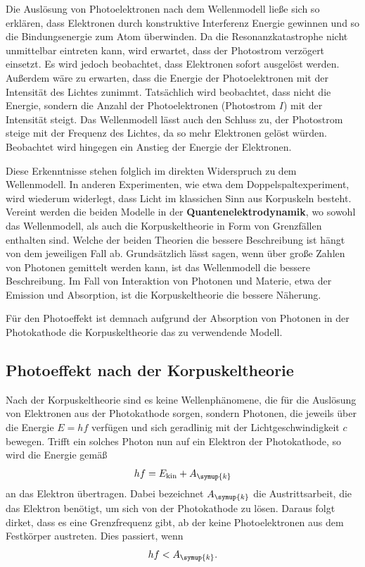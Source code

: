 Die Auslösung von Photoelektronen nach dem Wellenmodell ließe sich so erklären, dass Elektronen durch konstruktive Interferenz Energie
gewinnen und so die Bindungsenergie zum Atom überwinden.
Da die Resonanzkatastrophe nicht unmittelbar eintreten kann, wird erwartet, dass der Photostrom verzögert einsetzt. Es wird jedoch 
beobachtet, dass Elektronen sofort ausgelöst werden.
Außerdem wäre zu erwarten, dass die Energie der Photoelektronen mit der Intensität des Lichtes zunimmt. Tatsächlich wird beobachtet, dass
nicht die Energie, sondern die Anzahl der Photoelektronen (Photostrom $I$) mit der Intensität steigt.
Das Wellenmodell lässt auch den Schluss zu, der Photostrom steige mit der Frequenz des Lichtes, da so mehr Elektronen gelöst würden. 
Beobachtet wird hingegen ein Anstieg der Energie der Elektronen.

Diese Erkenntnisse stehen folglich im direkten Widerspruch zu dem Wellenmodell. In anderen Experimenten, wie etwa dem Doppelspaltexperiment,
wird wiederum widerlegt, dass Licht im klassichen Sinn aus Korpuskeln besteht.
Vereint werden die beiden Modelle in der \textbf{Quantenelektrodynamik}, wo sowohl das Wellenmodell, als auch die Korpuskeltheorie in Form
von Grenzfällen enthalten sind.
Welche der beiden Theorien die bessere Beschreibung ist hängt von dem jeweiligen Fall ab. Grundsätzlich lässt sagen, wenn über große Zahlen
von Photonen gemittelt werden kann, ist das Wellenmodell die bessere Beschreibung. Im Fall von Interaktion von Photonen und Materie, etwa
der Emission und Absorption, ist die Korpuskeltheorie die bessere Näherung.

Für den Photoeffekt ist demnach aufgrund der Absorption von Photonen in der Photokathode die Korpuskeltheorie das zu verwendende Modell.

\subsection{Photoeffekt nach der Korpuskeltheorie}
Nach der Korpuskeltheorie sind es keine Wellenphänomene, die für die Auslösung von Elektronen aus der Photokathode sorgen, sondern Photonen, 
die jeweils über die Energie $E=hf$ verfügen und sich geradlinig mit der Lichtgeschwindigkeit $c$ bewegen.
Trifft ein solches Photon nun auf ein Elektron der Photokathode, so wird die Energie gemäß
\begin{equation}
    hf = E_{\text{kin}}+A_{\symup{k}} \label{eq:Energie mit Auslösung}
\end{equation}
an das Elektron übertragen. Dabei bezeichnet $A_{\symup{k}}$ die Austrittsarbeit, die das Elektron benötigt, um sich von der Photokathode zu
lösen.
Daraus folgt dirket, dass es eine Grenzfrequenz gibt, ab der keine Photoelektronen aus dem Festkörper austreten. Dies passiert, wenn
\begin{equation}
    hf < A_{\symup{k}}. \label{eq:Grenzfrequenz}
\end{equation}

